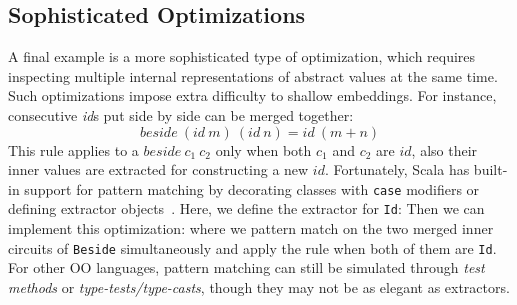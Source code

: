 \subsection{Sophisticated Optimizations}
A final example is a more sophisticated type of optimization, 
which requires inspecting multiple internal
representations of abstract values at the same time.
Such optimizations impose extra difficulty to shallow
embeddings.
For instance, consecutive \emph{id}s put side by side can be merged together:
$$
beside\ (id\ m)\ (id\ n) = id\ (m + n)
$$
This rule applies to a $beside\ c_1\ c_2$ only when both $c_1$ and $c_2$ are
$id$, also their inner values are extracted for constructing a new $id$.
Fortunately, Scala has built-in support for pattern matching by decorating
classes with \lstinline{case} modifiers or defining extractor objects~\cite{emir2007matching}.
Here, we define the extractor for \lstinline{Id}:
Then we can implement this optimization:
where we pattern match on the two merged inner circuits of \lstinline{Beside}
simultaneously and apply the rule when both of them are \lstinline{Id}.
For other OO languages, pattern matching can still be simulated through \emph{test methods} or \emph{type-tests/type-casts},
though they may not be as elegant as extractors.

